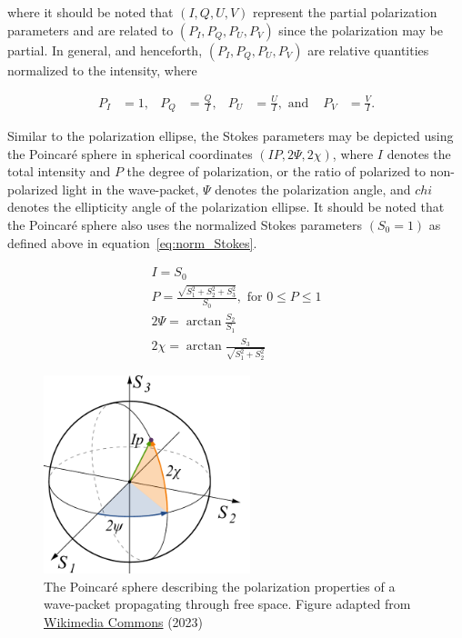 \noindent where it should be noted that $(I, Q, U, V)$ represent the partial polarization parameters and are related to $(P_{I}, P_{Q}, P_{U}, P_{V})$ since the polarization may be partial. In general, and henceforth, $(P_{I}, P_{Q}, P_{U}, P_{V})$ are relative quantities normalized to the intensity, where

\begin{align}
    P_{I} & = 1, & P_{Q} & = \frac{Q}{I}, & P_{U} & = \frac{U}{I}, \text{   and } & P_{V} & = \frac{V}{I}.
    \label{eq:norm_Stokes}
\end{align}

Similar to the polarization ellipse, the Stokes parameters may be depicted using the Poincar{\'e} sphere in spherical coordinates $(IP, 2 \Psi, 2 \chi)$, where $I$ denotes the total intensity and $P$ the degree of polarization, or the ratio of polarized to non-polarized light in the wave-packet, $\Psi$ denotes the polarization angle, and $chi$ denotes the ellipticity angle of the polarization ellipse. It should be noted that the Poincar{\'e} sphere also uses the normalized Stokes parameters $(S_{0} = 1)$ as defined above in equation~\ref{eq:norm_Stokes}.

\begin{equation}
    \begin{gathered}
        I = S_{0} \\
        P = \frac{\sqrt{S_{1}^2 + S_{2}^2 + S_{3}^2}}{S_{0}}, \text{ for } 0 \leq P \leq 1 \\
        2 \Psi = \arctan \frac{S_{2}}{S_{1}} \\
        2 \chi = \arctan \frac{S_{3}}{\sqrt{S_{1}^{2} + S_{2}^{2}}}
    \end{gathered}
    \label{eq:poincare_coords}
\end{equation}

\begin{figure}[t]
    \centering
    \includegraphics[width=6cm]{figures/2_poincare_sphere.pdf}
    \caption{The Poincar{\'e} sphere describing the polarization properties of a wave-packet propagating through free space. Figure adapted from \protect\href{https://commons.wikimedia.org/wiki/File:Poincaré_sphere.svg}{Wikimedia Commons} (2023)}
    \label{fig:poincare}
\end{figure}
\prgph

